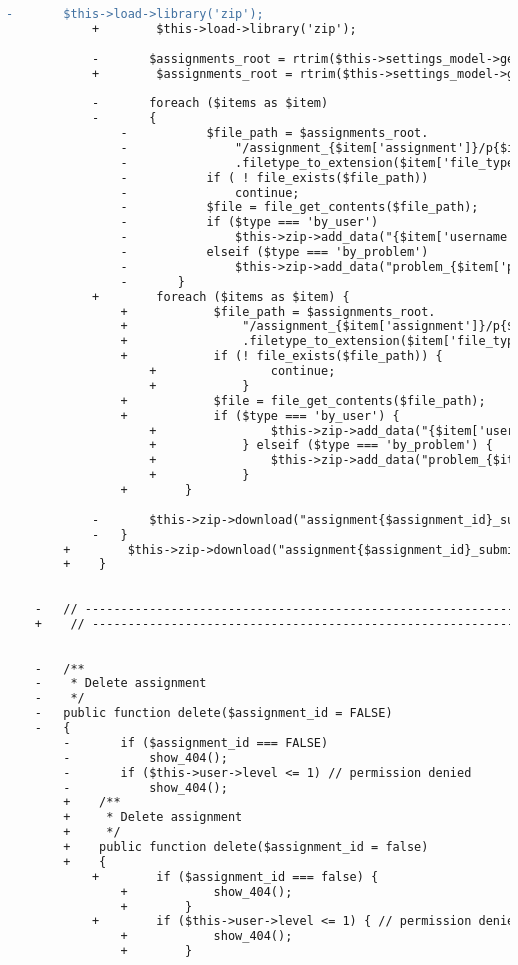 \begin{lstlisting}[language=diff, caption=Perubahan pada kode Assignments.php]
			-		$this->load->library('zip');
			+        $this->load->library('zip');
			
			-		$assignments_root = rtrim($this->settings_model->get_setting('assignments_root'),'/');
			+        $assignments_root = rtrim($this->settings_model->get_setting('assignments_root'), '/');
			
			-		foreach ($items as $item)
			-		{
				-			$file_path = $assignments_root.
				-				"/assignment_{$item['assignment']}/p{$item['problem']}/{$item['username']}/{$item['file_name']}."
				-				.filetype_to_extension($item['file_type']);
				-			if ( ! file_exists($file_path))
				-				continue;
				-			$file = file_get_contents($file_path);
				-			if ($type === 'by_user')
				-				$this->zip->add_data("{$item['username']}/p{$item['problem']}.".filetype_to_extension($item['file_type']), $file);
				-			elseif ($type === 'by_problem')
				-				$this->zip->add_data("problem_{$item['problem']}/{$item['username']}.".filetype_to_extension($item['file_type']), $file);
				-		}
			+        foreach ($items as $item) {
				+            $file_path = $assignments_root.
				+                "/assignment_{$item['assignment']}/p{$item['problem']}/{$item['username']}/{$item['file_name']}."
				+                .filetype_to_extension($item['file_type']);
				+            if (! file_exists($file_path)) {
					+                continue;
					+            }
				+            $file = file_get_contents($file_path);
				+            if ($type === 'by_user') {
					+                $this->zip->add_data("{$item['username']}/p{$item['problem']}.".filetype_to_extension($item['file_type']), $file);
					+            } elseif ($type === 'by_problem') {
					+                $this->zip->add_data("problem_{$item['problem']}/{$item['username']}.".filetype_to_extension($item['file_type']), $file);
					+            }
				+        }
			
			-		$this->zip->download("assignment{$assignment_id}_submissions_{$type}_".date('Y-m-d_H-i',shj_now()).'.zip');
			-	}
		+        $this->zip->download("assignment{$assignment_id}_submissions_{$type}_".date('Y-m-d_H-i', shj_now()).'.zip');
		+    }
	
	
	-	// ------------------------------------------------------------------------
	+    // ------------------------------------------------------------------------
	
	
	-	/**
	-	 * Delete assignment
	-	 */
	-	public function delete($assignment_id = FALSE)
	-	{
		-		if ($assignment_id === FALSE)
		-			show_404();
		-		if ($this->user->level <= 1) // permission denied
		-			show_404();
		+    /**
		+     * Delete assignment
		+     */
		+    public function delete($assignment_id = false)
		+    {
			+        if ($assignment_id === false) {
				+            show_404();
				+        }
			+        if ($this->user->level <= 1) { // permission denied
				+            show_404();
				+        }
			

\end{lstlisting}
